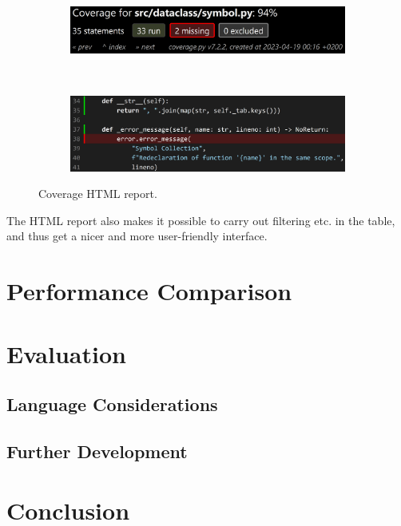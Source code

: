 \begin{figure}[H]
    \centering
    \begin{subfigure}{1\textwidth}
        \centering
        \includegraphics[width=1\textwidth]{misc/images/Coverage_Panel.png}
        \end{subfigure}\\
        \begin{subfigure}{1\textwidth}
        \centering
        \includegraphics[width=1\textwidth]{misc/images/Coverage_Info.png}
        \end{subfigure}
    \caption{Coverage HTML report.}
\end{figure}

The HTML report also makes it possible to carry out filtering etc. in the table, and thus get a nicer and more user-friendly interface.

\chapter{Performance Comparison}

\chapter{Evaluation}
\section{Language Considerations}
\section{Further Development}
 
\chapter{Conclusion}

\cleardoublepage
{}
{}
\printbibliography
